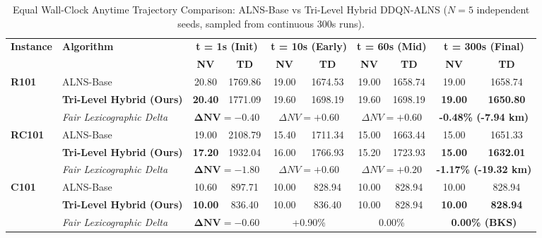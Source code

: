 \documentclass{ieeeaccess}
\begin{document}
\begin{table}[!t]
\caption{Equal Wall-Clock Anytime Trajectory Comparison: ALNS-Base vs Tri-Level Hybrid DDQN-ALNS ($N=5$ independent seeds, sampled from continuous 300s runs).}
\label{tab:anytime_wallclock}
\centering
\footnotesize
\setlength{\tabcolsep}{5pt}
\begin{tabular*}{\textwidth}{@{\extracolsep{\fill}} ll cccccc cc @{}}
\toprule
\multirow{2}{*}{\textbf{Instance}} & \multirow{2}{*}{\textbf{Algorithm}} & \multicolumn{2}{c}{\textbf{t = 1s (Init)}} & \multicolumn{2}{c}{\textbf{t = 10s (Early)}} & \multicolumn{2}{c}{\textbf{t = 60s (Mid)}} & \multicolumn{2}{c}{\textbf{t = 300s (Final)}} \\
\cmidrule(lr){3-4} \cmidrule(lr){5-6} \cmidrule(lr){7-8} \cmidrule(lr){9-10}
 & & \textbf{NV} & \textbf{TD} & \textbf{NV} & \textbf{TD} & \textbf{NV} & \textbf{TD} & \textbf{NV} & \textbf{TD} \\
\midrule
\multirow{3}{*}{\textbf{R101}} & ALNS-Base & 20.80 & 1769.86 & 19.00 & 1674.53 & 19.00 & 1658.74 & 19.00 & 1658.74 \\
 & \textbf{Tri-Level Hybrid (Ours)} & \textbf{20.40} & 1771.09 & 19.60 & 1698.19 & 19.60 & 1698.19 & \textbf{19.00} & \textbf{1650.80} \\
 & \textit{Fair Lexicographic Delta} & \multicolumn{2}{c}{$\mathbf{\Delta NV = -0.40}$} & \multicolumn{2}{c}{$\Delta NV = +0.60$} & \multicolumn{2}{c}{$\Delta NV = +0.60$} & \multicolumn{2}{c}{\textbf{-0.48\% (-7.94 km)}} \\
\midrule
\multirow{3}{*}{\textbf{RC101}} & ALNS-Base & 19.00 & 2108.79 & 15.40 & 1711.34 & 15.00 & 1663.44 & 15.00 & 1651.33 \\
 & \textbf{Tri-Level Hybrid (Ours)} & \textbf{17.20} & 1932.04 & 16.00 & 1766.93 & 15.20 & 1723.93 & \textbf{15.00} & \textbf{1632.01} \\
 & \textit{Fair Lexicographic Delta} & \multicolumn{2}{c}{$\mathbf{\Delta NV = -1.80}$} & \multicolumn{2}{c}{$\Delta NV = +0.60$} & \multicolumn{2}{c}{$\Delta NV = +0.20$} & \multicolumn{2}{c}{\textbf{-1.17\% (-19.32 km)}} \\
\midrule
\multirow{3}{*}{\textbf{C101}} & ALNS-Base & 10.60 & 897.71 & 10.00 & 828.94 & 10.00 & 828.94 & 10.00 & 828.94 \\
 & \textbf{Tri-Level Hybrid (Ours)} & \textbf{10.00} & 836.40 & 10.00 & 836.40 & 10.00 & 828.94 & \textbf{10.00} & \textbf{828.94} \\
 & \textit{Fair Lexicographic Delta} & \multicolumn{2}{c}{$\mathbf{\Delta NV = -0.60}$} & \multicolumn{2}{c}{+0.90\%} & \multicolumn{2}{c}{0.00\%} & \multicolumn{2}{c}{\textbf{0.00\% (BKS)}} \\

\end{tabular*}
\end{table}
\end{document}
